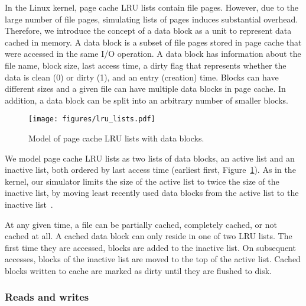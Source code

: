 \documentclass[conference]{IEEEtran}
\begin{document}
    In the Linux kernel, page cache LRU lists contain file pages. However,
    due to the large number of file pages, simulating lists of pages
    induces substantial overhead.
    Therefore, we introduce the concept of a data block as a unit to represent data
    cached in memory. A data block is a subset of file pages stored in
    page cache that were accessed in the same I/O operation.
    A data block has information about the file name, block size, last access
    time, a dirty flag that represents whether the data is clean (0)
    or dirty (1), and an entry (creation) time.
    Blocks can have different sizes and a given file can have multiple
    data blocks in page cache. In addition, a data block can be split into an
    arbitrary number of smaller blocks.
    \begin{figure}
           \centering
           \texttt{[image: figures/lru\_lists.pdf]}
           \caption{Model of page cache LRU lists with data blocks.}
           \label{fig:lrulist}
    \end{figure}

    We model page cache LRU lists as
    two lists of data blocks, an active list and an inactive list, both ordered by
    last access time (earliest first, Figure~\ref{fig:lrulist}).
    As in the kernel, our simulator limits the size of the active list to
    twice the size of the inactive list, by moving least recently
    used data blocks from the active list to the inactive list~\cite{gorman2004understanding, linuxdev3rd2010}.

    At any given time, a file can be partially cached, completely cached,
    or not cached at all. A cached data block can only reside in one of two
    LRU lists. The first time they are accessed, blocks are
    added to the inactive list. On subsequent accesses, blocks of the
    inactive list are moved to the top of the active list. Cached blocks
    written to cache are marked as dirty until they are flushed to disk.

    \subsubsection{Reads and writes}
\end{document}
